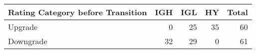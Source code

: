 \begin{tabular}{lrrrr}
\toprule
Rating Category before Transition & IGH & IGL & HY & Total \\
\midrule
Upgrade & 0 & 25 & 35 & 60 \\
Downgrade & 32 & 29 & 0 & 61 \\
\bottomrule
\end{tabular}
